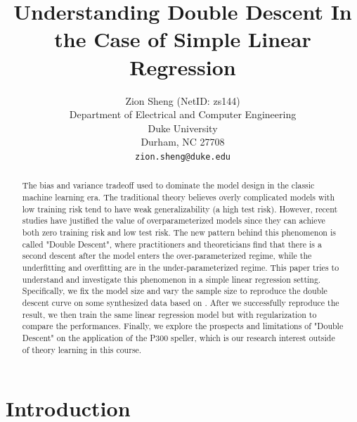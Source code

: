 \documentclass{article}
\title{Understanding Double Descent In the Case of Simple Linear Regression}
\author{
	Zion Sheng (NetID: zs144)\\
	Department of Electrical and Computer Engineering\\
	Duke University\\
	Durham, NC 27708 \\
	\texttt{zion.sheng@duke.edu} \\
}
\date{} %
\begin{document}
\maketitle

\begin{abstract}
	The bias and variance tradeoff used to dominate the model design in the classic machine learning era. The traditional theory believes overly complicated models with low training risk tend to have weak generalizability (a high test risk). However, recent studies have justified the value of overparameterized models since they can achieve both zero training risk and low test risk. The new pattern behind this phenomenon is called "Double Descent", where practitioners and theoreticians find that there is a second descent after the model enters the over-parameterized regime, while the underfitting and overfitting are in the under-parameterized regime. This paper tries to understand and investigate this phenomenon in a simple linear regression setting. Specifically, we fix the model size and vary the sample size to reproduce the double descent curve on some synthesized data based on \cite{nakkiran2019more}. After we successfully reproduce the result, we then train the same linear regression model but with regularization to compare the performances. Finally, we explore the prospects and limitations of "Double Descent" on the application of the P300 speller, which is our research interest outside of theory learning in this course.
\end{abstract}




\section{Introduction} \label{Introduction}
\end{document}
